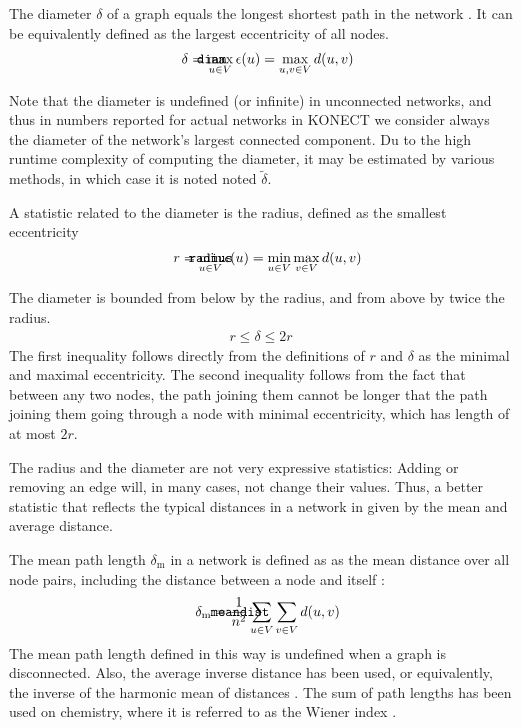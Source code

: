 \documentclass{article}
\def\mathnote#1{%
  \tag*{\rlap{\hspace\marginparsep\smash{\parbox[t]{\marginparwidth}{#1}}}}
}
\begin{document}
The diameter $\delta$ of a graph equals the longest shortest path in the
network \citep{b779}.  It can be equivalently defined as the largest eccentricity of
all nodes.
\begin{align}
  \mathnote{\texttt{diam}} \delta &= \max_{u \in V} \epsilon(u) =
  \max_{u,v \in V} d(u,v)
\end{align}

Note that the diameter is undefined (or infinite) in unconnected
networks, and thus in numbers reported for actual networks in KONECT we
consider always the diameter of the network's largest connected
component.  Du to the high runtime complexity of computing the diameter,
it may be estimated by various methods, in which case it is noted noted
$\tilde \delta$.

A statistic related to the diameter is the radius, defined as the
smallest eccentricity
\begin{align}
  \mathnote{\texttt{radius}} r &= \min_{u \in V} \epsilon(u) = \min_{u
    \in V} \max_{v \in V} d(u,v)
\end{align}

The diameter is bounded from below by the radius, and from above by
twice the radius.  
\begin{align*}
  r \leq \delta \leq 2r
\end{align*}
The first inequality follows directly from the definitions of $r$ and
$\delta$ as the minimal and maximal eccentricity.  The second inequality
follows from the fact that between any two nodes, the path joining them
cannot be longer that the path joining them going through a node with
minimal eccentricity, which has length of at most $2r$. 

The radius and the diameter are not very expressive statistics: Adding
or removing an edge will, in many cases, not change their values.  Thus,
a better statistic that reflects the typical distances in a network in
given by the mean and average distance.

The mean path length $\delta_{\mathrm m}$ in a network is defined as as
the mean distance over all node pairs, including the distance between a
node and itself \citep{b779}:
\begin{align}
  \mathnote{\texttt{meandist}} 
  \delta_{\mathrm m} &= \frac 1 {n^2}
  \sum_{u \in V} \sum_{v\in V} d(u,v)
\end{align}
The mean path length defined in this way is undefined when a graph is
disconnected.  Also, the average inverse distance has been used, or
equivalently, the inverse of the harmonic mean of distances
\citep{b877}.  The sum of path lengths has been used on chemistry, where
it is referred to as the Wiener index \citep{b901}.
\end{document}
